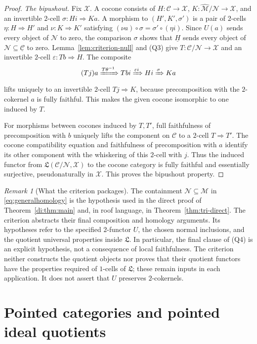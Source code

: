 \documentclass[11pt,reqno,a4paper]{amsart}
\theoremstyle{definition}
\theoremstyle{remark}
\newtheorem{remark}[theorem]{Remark}
\newcommand{\C}{\mathcal{C}}
\newcommand{\M}{\mathcal{M}}
\newcommand{\N}{\mathcal{N}}
\newcommand{\0}{\mathbf{0}}
\renewcommand{\1}{\mathbf{1}}
\newcommand{\Lcat}{\mathfrak L}
\newcommand{\X}{\mathcal X}
\begin{document}
\begin{proof}
\emph{The bipushout.}
Fix $\X$. A cocone consists of $H:\C\to\X$,
$K:\widehat{\M}/\N\to\X$, and an invertible $2$-cell
$\sigma:Hi\Rightarrow Ka$.
A morphism to $(H',K',\sigma')$ is a pair of $2$-cells
$\eta:H\Rightarrow H'$ and $\nu:K\Rightarrow K'$ satisfying
$(\nu a)\circ\sigma=\sigma'\circ(\eta i)$.
Since $U(a)$ sends every object of $\N$ to zero, the
comparison $\sigma$ shows that $\underline{H}$ sends every
object of $\N\subseteq\underline{\C}$ to zero.
Lemma~\ref{lem:criterion-null} and (Q3) give
$T:\C/\N\to\X$ and an invertible $2$-cell
$\varepsilon:Tb\Rightarrow H$.
The composite
\[
 (Tj)a\xRightarrow{T\theta^{-1}}Tbi
 \xRightarrow{\varepsilon i}Hi
 \xRightarrow{\sigma}Ka
\]
lifts uniquely to an invertible $2$-cell $Tj\Rightarrow K$,
because precomposition with the $2$-cokernel $a$ is fully
faithful. This makes the given cocone isomorphic to one induced
by $T$.

For morphisms between cocones induced by $T,T'$, full
faithfulness of precomposition with $b$ uniquely lifts the
component on $\C$ to a $2$-cell $T\Rightarrow T'$.
The cocone compatibility equation and faithfulness of
precomposition with $a$ identify its other component with
the whiskering of this $2$-cell with $j$.
Thus the induced functor from $\Lcat(\C/\N,\X)$ to the
cocone category is fully faithful and essentially surjective,
pseudonaturally in $\X$. This proves the bipushout property.
\end{proof}

\begin{remark}[What the criterion packages]\label{rem:criterion-role}
The containment $\N\subseteq\M$ in
\eqref{eq:generalhomology} is the hypothesis used in the direct
proof of Theorem~\ref{di:thm:main} and, in roof language, in
Theorem~\ref{thm:tri-direct}. The criterion abstracts their final
composition and homology arguments.
Its hypotheses refer to the specified $2$-functor $U$, the
chosen normal inclusions, and the quotient universal properties
inside $\Lcat$. In particular, the final clause of (Q4) is an
explicit hypothesis, not a consequence of local faithfulness.
The criterion neither constructs the quotient objects nor proves
that their quotient functors have the properties required of
$1$-cells of $\Lcat$; these remain inputs in each application.
It does not assert that $U$ preserves $2$-cokernels.
\end{remark}


\section{Pointed categories and pointed ideal quotients}\label{sec:pointed}
\end{document}
